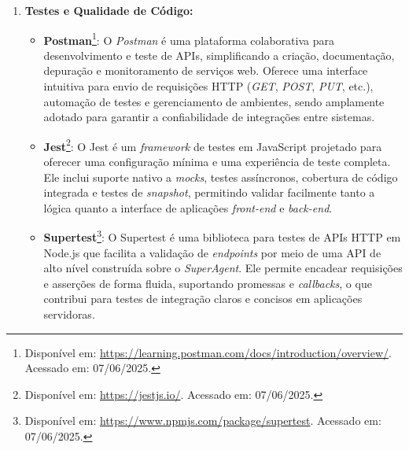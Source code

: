 \begin{enumerate}
\begin{itemize}
            \item \textbf{TypeORM}\footnote{Disponível em: \url{https://typeorm.io/}. Acessado em: 07/06/2025.}: 
                O TypeORM é um ORM leve para TypeScript e JavaScript que facilita o mapeamento entre classes e bancos de dados. Suporta diversos bancos (MySQL, PostgreSQL, SQLite, SQL Server, MongoDB etc.), oferece migrações automáticas e um \textit{QueryBuilder} intuitivo. Com tipagem completa em TypeScript, simplifica operações de CRUD, relacionamentos e transações de forma segura e escalável. %
            \par\vspace{0.75\baselineskip}
        \end{itemize}

        \item \textbf{Testes e Qualidade de Código:}  
        \begin{itemize}
            \item \textbf{Postman}\footnote{Disponível em: \url{https://learning.postman.com/docs/introduction/overview/}. Acessado em: 07/06/2025.}: 
                O \textit{Postman} é uma plataforma colaborativa para desenvolvimento e teste de APIs, simplificando a criação, documentação, depuração e monitoramento de serviços web. Oferece uma interface intuitiva para envio de requisições HTTP (\textit{GET}, \textit{POST}, \textit{PUT}, etc.), automação de testes e gerenciamento de ambientes, sendo amplamente adotado para garantir a confiabilidade de integrações entre sistemas.
            \par\vspace{0.25\baselineskip}
    
            \item \textbf{Jest}\footnote{Disponível em: \url{https://jestjs.io/}. Acessado em: 07/06/2025.}: 
                O Jest é um \textit{framework} de testes em JavaScript projetado para oferecer uma configuração mínima e uma experiência de teste completa. Ele inclui suporte nativo a \textit{mock}\textit{s}, testes assíncronos, cobertura de código integrada e testes de \textit{snapshot}, permitindo validar facilmente tanto a lógica quanto a interface de aplicações \textit{front-end} e \textit{back-end}.
            \par\vspace{0.25\baselineskip}
            
            \item \textbf{Supertest}\footnote{Disponível em: \url{https://www.npmjs.com/package/supertest}. Acessado em: 07/06/2025.}: 
                O Supertest é uma biblioteca para testes de APIs HTTP em Node.js que facilita a validação de \textit{endpoints} por meio de uma API de alto nível construída sobre o \textit{SuperAgent}. Ele permite encadear requisições e asserções de forma fluida, suportando promessas e \textit{callbacks}, o que contribui para testes de integração claros e concisos em aplicações servidoras.
            \par\vspace{0.25\baselineskip}
        

\end{itemize}
\end{enumerate}
